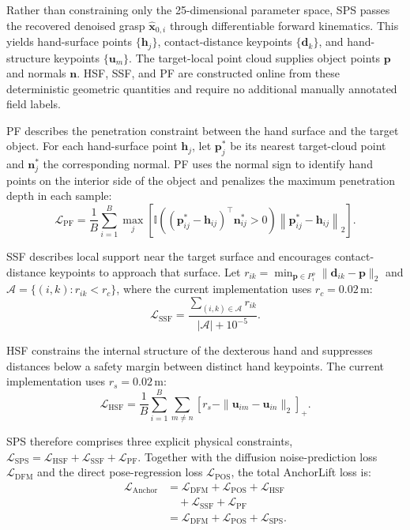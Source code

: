 \documentclass[lettersize,journal]{IEEEtran}
\begin{document}
Rather than constraining only the 25-dimensional parameter space, SPS passes the recovered denoised grasp $\hat{\mathbf{x}}_{0,i}$ through differentiable forward kinematics. This yields hand-surface points $\{\mathbf h_j\}$, contact-distance keypoints $\{\mathbf d_k\}$, and hand-structure keypoints $\{\mathbf u_m\}$. The target-local point cloud supplies object points $\mathbf p$ and normals $\mathbf n$. HSF, SSF, and PF are constructed online from these deterministic geometric quantities and require no additional manually annotated field labels.

PF describes the penetration constraint between the hand surface and the target object. For each hand-surface point $\mathbf h_j$, let $\mathbf p_j^*$ be its nearest target-cloud point and $\mathbf n_j^*$ the corresponding normal. PF uses the normal sign to identify hand points on the interior side of the object and penalizes the maximum penetration depth in each sample:
\begin{equation}
\mathcal L_{\mathrm{PF}}
=\frac{1}{B}\sum_{i=1}^{B}
\max_j\left[
\mathbb I\!\left((\mathbf p_{ij}^*-\mathbf h_{ij})^\top
\mathbf n_{ij}^*>0\right)
\left\|\mathbf p_{ij}^*-\mathbf h_{ij}\right\|_2
\right].
\tag{4c}\label{eq:pf_loss}
\end{equation}

SSF describes local support near the target surface and encourages contact-distance keypoints to approach that surface. Let $r_{ik}=\min_{\mathbf p\in P_i^o}\|\mathbf d_{ik}-\mathbf p\|_2$ and $\mathcal A=\{(i,k):r_{ik}<r_c\}$, where the current implementation uses $r_c=0.02\,\mathrm m$:
\begin{equation}
\mathcal L_{\mathrm{SSF}}
=\frac{\sum_{(i,k)\in\mathcal A}r_{ik}}
{|\mathcal A|+10^{-5}}.
\tag{4d}\label{eq:ssf_loss}
\end{equation}

HSF constrains the internal structure of the dexterous hand and suppresses distances below a safety margin between distinct hand keypoints. The current implementation uses $r_s=0.02\,\mathrm m$:
\begin{equation}
\mathcal L_{\mathrm{HSF}}
=\frac{1}{B}\sum_{i=1}^{B}\sum_{m\ne n}
\left[r_s-\|\mathbf u_{im}-\mathbf u_{in}\|_2\right]_+ .
\tag{4e}\label{eq:hsf_loss}
\end{equation}

SPS therefore comprises three explicit physical constraints, $\mathcal L_{\mathrm{SPS}}=\mathcal L_{\mathrm{HSF}}+\mathcal L_{\mathrm{SSF}}+\mathcal L_{\mathrm{PF}}$. Together with the diffusion noise-prediction loss $\mathcal L_{\mathrm{DFM}}$ and the direct pose-regression loss $\mathcal L_{\mathrm{POS}}$, the total AnchorLift loss is:
\begin{equation}
\begin{aligned}
\mathcal L_{\mathrm{Anchor}}
&=\mathcal L_{\mathrm{DFM}}+\mathcal L_{\mathrm{POS}}
+\mathcal L_{\mathrm{HSF}}\\
&\quad+\mathcal L_{\mathrm{SSF}}+\mathcal L_{\mathrm{PF}}\\
&=\mathcal L_{\mathrm{DFM}}+\mathcal L_{\mathrm{POS}}
+\mathcal L_{\mathrm{SPS}}.
\end{aligned}
\tag{4f}\label{eq:anchorlift_loss}
\end{equation}
\end{document}
